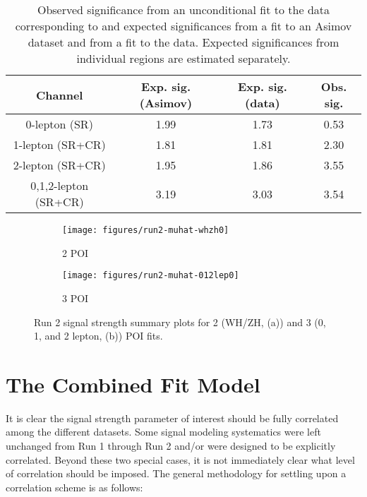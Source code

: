 \begin{table}[!htbp]\captionsetup{justification=centering}
  \centering
  \begin{tabular}{c|||c|c|c}
     \hline\hline
    Channel  & Exp. sig. (Asimov) & Exp. sig. (data) & Obs. sig. \\
     \hline\hline
    0-lepton (SR)          	& 1.99  & 1.73 & 0.53 \\
    1-lepton (SR+CR)     	&  1.81 & 1.81 & 2.30 \\
    2-lepton (SR+CR)         	& 1.95  & 1.86 & 3.55 \\ %
    \hline\hline
    0,1,2-lepton (SR+CR)    &  3.19 & 3.03 & 3.54 \\
    \hline\hline
  \end{tabular}
  \caption{Observed significance from an unconditional fit to the data corresponding to \LUMI and expected significances from a fit to an Asimov dataset and from a fit to the data. Expected significances from individual regions are estimated separately. } 
  \label{tab:nuis_sig}
\end{table}

\begin{figure}[!htbp]\captionsetup{justification=centering}
  \centering
  \begin{subfigure}[t]{0.49\textwidth}\centering\texttt{[image: figures/run2-muhat-whzh0]}\caption{2 POI}\end{subfigure}
  \begin{subfigure}[t]{0.49\textwidth}\centering\texttt{[image: figures/run2-muhat-012lep0]}\caption{3 POI}\end{subfigure}
    \caption{Run 2 signal strength summary plots for 2 (WH/ZH, (a)) and 3 (0, 1, and 2 lepton, (b)) POI fits.}
    \label{fig:r2muhat}
\end{figure}

\clearpage

\section{The Combined Fit Model}
\label{sec:combmodel}
It is clear the signal strength parameter of interest should be fully correlated among the different datasets.  Some signal modeling systematics were left unchanged from Run 1 through Run 2 and/or were designed to be explicitly correlated.  Beyond these two special cases, it is not immediately clear what level of correlation should be imposed.  The general methodology for settling upon a correlation scheme is as follows:

